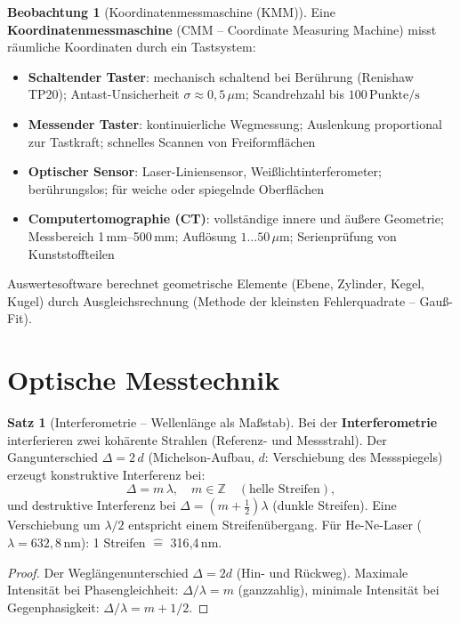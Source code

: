 ﻿\documentclass[a4paper,12pt]{report}
\theoremstyle{definition}
\newtheorem{satz}{Satz}
\newtheorem{beobachtung}{Beobachtung}
\begin{document}
\begin{beobachtung}[Koordinatenmessmaschine (KMM)]
Eine \textbf{Koordinatenmessmaschine} (CMM -- Coordinate Measuring Machine)
misst räumliche Koordinaten durch ein Tastsystem:
\begin{itemize}
    \item[-] \textbf{Schaltender Taster}: mechanisch schaltend bei Berührung
          (Renishaw TP20); Antast-Unsicherheit $\sigma \approx 0{,}5\,\mu\mathrm{m}$;
          Scandrehzahl bis $100\,\mathrm{Punkte/s}$
    \item[-] \textbf{Messender Taster}: kontinuierliche Wegmessung; Auslenkung proportional
          zur Tastkraft; schnelles Scannen von Freiformflächen
    \item[-] \textbf{Optischer Sensor}: Laser-Liniensensor, Weißlichtinterferometer;
          berührungslos; für weiche oder spiegelnde Oberflächen
    \item[-] \textbf{Computertomographie (CT)}: vollständige innere und äußere
          Geometrie; Messbereich 1\,mm--500\,mm; Auflösung $1\ldots50\,\mu\mathrm{m}$;
          Serienprüfung von Kunststoffteilen
\end{itemize}
Auswertesoftware berechnet geometrische Elemente (Ebene, Zylinder, Kegel, Kugel)
durch Ausgleichsrechnung (Methode der kleinsten Fehlerquadrate -- Gauß-Fit).
\end{beobachtung}

\section{Optische Messtechnik}

\begin{satz}[Interferometrie -- Wellenlänge als Maßstab]
Bei der \textbf{Interferometrie} interferieren zwei kohärente Strahlen
(Referenz- und Messstrahl). Der Gangunterschied $\Delta = 2\,d$ (Michelson-Aufbau,
$d$: Verschiebung des Messspiegels) erzeugt konstruktive Interferenz bei:
\[
  \Delta = m\,\lambda, \quad m \in \mathbb{Z} \quad (\text{helle Streifen}),
\]
und destruktive Interferenz bei $\Delta = (m + \tfrac{1}{2})\lambda$ (dunkle Streifen).
Eine Verschiebung um $\lambda/2$ entspricht einem Streifenübergang.
Für He-Ne-Laser ($\lambda = 632{,}8\,\mathrm{nm}$): 1 Streifen $\hat{=}$ 316{,}4\,nm.
\end{satz}
\begin{proof}
Der Weglängenunterschied $\Delta = 2d$ (Hin- und Rückweg).
Maximale Intensität bei Phasengleichheit: $\Delta/\lambda = m$ (ganzzahlig),
minimale Intensität bei Gegenphasigkeit: $\Delta/\lambda = m + 1/2$.
\end{proof}
\end{document}
